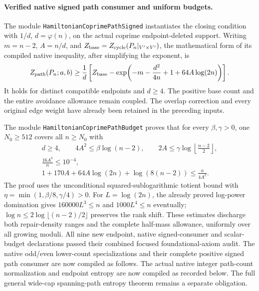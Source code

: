 \paragraph{Verified native signed path consumer and uniform budgets.}
The module \texttt{HamiltonianCoprimePathSigned} instantiates the
closing condition with \(1/d\), \(d=\varphi(n)\), on the actual
coprime endpoint-deleted support. Writing \(m=n-2\), \(A=n/d\),
and \(Z_{\rm base}=Z_{\rm cycle}(P_n|_{V'\times V'})\), the mathematical
form of its compiled native inequality, after simplifying the
exponent, is
\[
 Z_{\rm path}(P_n;a,b)\geq
 \frac1d\left[
 Z_{\rm base}-
 \exp\!\left(-m-\frac{d^2}{4n}+1+64A\log(2n)\right)\right].
\]
It holds for distinct compatible endpoints and \(d\geq4\).
The positive base count and the entire avoidance allowance remain
coupled. The overlap correction and every original edge weight
have already been retained in the preceding inputs.

The module \texttt{HamiltonianCoprimePathBudget} proves that for
every \(\beta,\gamma>0\), one \(N_0\geq512\) covers all \(n\geq N_0\)
with
\[
 \begin{gathered}
 d\geq4,\qquad
 4A^2\leq\beta\log(n-2),\qquad
 2A\leq\gamma\log\!\left\lfloor\frac{n-2}{2}\right\rfloor,\\
 \frac{16A^3}{n}\leq10^{-4},\\
 1+170A+64A\log(2n)+\log(8(n-2))
          \leq\frac{n}{4A^2}.
 \end{gathered}
\]
The proof uses the unconditional squared-sublogarithmic totient
bound with
\(\eta=\min(1,\beta/8,\gamma/4)>0\).
For \(L=\log(2n)\), the already proved log-power domination gives
\(160000L^3\leq n\) and \(1000L^4\leq n\) eventually;
\(\log n\leq2\log\lfloor(n-2)/2\rfloor\) preserves the rank shift.
These estimates discharge both repair-density ranges and the
complete half-mass allowance, uniformly over all growing moduli.
All nine new endpoint, native signed-consumer and scalar-budget
declarations passed their combined focused foundational-axiom audit.
The native odd/even lower-count specializations and their complete
positive signed path consumer are now compiled as follows.
The actual native integer path-count normalization and endpoint entropy
are now compiled as recorded below. The full general wide-cap
spanning-path entropy theorem remains a separate obligation.

